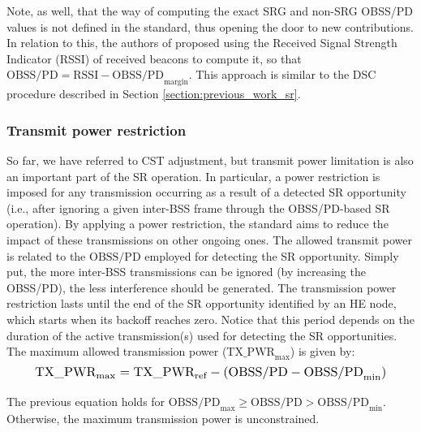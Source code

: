 \documentclass{ieeeaccess}
\begin{document}
Note, as well, that the way of computing the exact SRG and non-SRG OBSS/PD values is not defined in the standard, thus opening the door to new contributions. In relation to this, the authors of \cite{tgax2016obss_pd_evaluation} proposed using the Received Signal Strength Indicator (RSSI) of received beacons to compute it, so that $\text{OBSS/PD} =  \text{RSSI} - \text{OBSS/PD}_{\text{margin}}$. This approach is similar to the DSC procedure described in Section \ref{section:previous_work_sr}.

\subsubsection{Transmit power restriction}	\label{section:tx_power_restriction}
So far, we have referred to CST adjustment, but transmit power limitation is also an important part of the SR operation. In particular, a power restriction is imposed for any transmission occurring as a result of a detected SR opportunity (i.e., after ignoring a given inter-BSS frame through the OBSS/PD-based SR operation). By applying a power restriction, the standard aims to reduce the impact of these transmissions on other ongoing ones. The allowed transmit power is related to the $\text{OBSS/PD}$ employed for detecting the SR opportunity. Simply put, the more inter-BSS transmissions can be ignored (by increasing the OBSS/PD), the less interference should be generated. The transmission power restriction lasts until the end of the SR opportunity identified by an HE node, which starts when its backoff reaches zero. Notice that this period depends on the duration of the active transmission(s) used for detecting the SR opportunities. The maximum allowed transmission power ($\text{TX\_PWR}_{\max}$) is given by:
\begin{equation}
\resizebox{0.9\columnwidth}{!}{%
	$\text{TX\_PWR}_{\max} = \text{TX\_PWR}_{\text{ref}} - (\text{OBSS/PD} -\text{OBSS/PD}_{\min})$}
\label{eq:power_restriction}
\end{equation}

The previous equation holds for $\text{OBSS/PD}_{\max} \geq \text{OBSS/PD} > \text{OBSS/PD}_{\min}$. Otherwise, the maximum transmission power is unconstrained.
\end{document}
